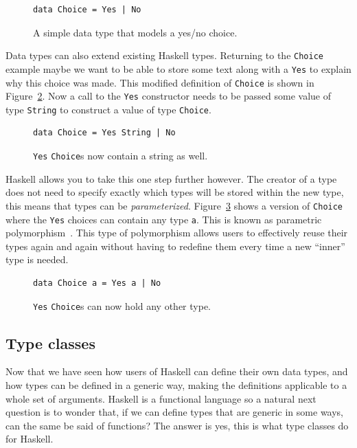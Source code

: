 \begin{figure}[t]
\begin{lstlisting}
data Choice = Yes | No
\end{lstlisting}
\caption{A simple data type that models a yes/no choice.}
\label{simpleDataTy}
\end{figure}

Data types can also extend existing Haskell types. Returning to the \texttt{Choice} example maybe we want to be able to store some text along with a \texttt{Yes} to explain why this choice was made. This modified definition of \texttt{Choice} is shown in Figure~\ref{stringChoice}. Now a call to the \texttt{Yes} constructor needs to be passed some value of type \texttt{String} to construct a value of type \texttt{Choice}. 

  \begin{figure}[t]
\begin{lstlisting}
data Choice = Yes String | No
\end{lstlisting}
\caption{\texttt{Yes} \texttt{Choice}s now contain a string as well.}
\label{stringChoice}
\end{figure}

Haskell allows you to take this one step further however. The creator of a type does not need to specify exactly which types will be stored within the new type, this means that types can be \textit{parameterized}. Figure~\ref{choiceParam} shows a version of \texttt{Choice} where the \texttt{Yes} choices can contain any type \texttt{a}. This is known as parametric polymorphism~\citep{haskellWikiPolymorphism}. This type of polymorphism allows users to effectively reuse their types again and again without having to redefine them every time a new ``inner'' type is needed.

  \begin{figure}[t]
\begin{lstlisting}
data Choice a = Yes a | No
\end{lstlisting}
\caption{\texttt{Yes} \texttt{Choice}s can now hold any other type.}
\label{choiceParam}
\end{figure}

\subsection{Type classes}

Now that we have seen how users of Haskell can define their own data types, and how types can be defined in a generic way, making the definitions applicable to a whole set of arguments. Haskell is a functional language  so a natural next question is to wonder that, if we can define types that are generic in some ways, can the same be said of functions? The answer is yes, this is what type classes do for Haskell.

